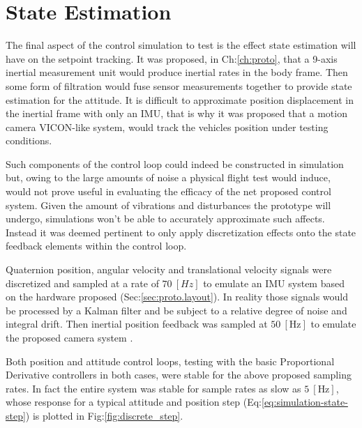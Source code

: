 \section{State Estimation}
\label{sec:simulation.state}
The final aspect of the control simulation to test is the effect state estimation will have on the setpoint tracking. It was proposed, in Ch:\ref{ch:proto}, that a 9-axis inertial measurement unit would produce inertial rates in the body frame. Then some form of filtration would fuse sensor measurements together to provide state estimation for the attitude. It is difficult to approximate position displacement in the inertial frame with only an IMU, that is why it was proposed that a motion camera VICON-like system, \cite{arnold} would track the vehicles position under testing conditions. 
\par
Such components of the control loop could indeed be constructed in simulation but, owing to the large amounts of noise a physical flight test would induce, would not prove useful in evaluating the efficacy of the net proposed control system. Given the amount of vibrations and disturbances the prototype will undergo, simulations won't be able to accurately approximate such affects. Instead it was deemed pertinent to only apply discretization effects onto the state feedback elements within the control loop.
\par
Quaternion position, angular velocity and translational velocity signals were discretized and sampled at a rate of $70~[Hz]$ to emulate an IMU system based on the hardware proposed (Sec:\ref{sec:proto.layout}). In reality those signals would be processed by a Kalman filter and be subject to a relative degree of noise and integral drift. Then inertial position feedback was sampled at $50~[\text{Hz}]$ to emulate the proposed camera system \cite{arnold}.
\par
Both position and attitude control loops, testing with the basic Proportional Derivative controllers in both cases, were stable for the above proposed sampling rates. In fact the entire system was stable for sample rates as slow as $5~[\text{Hz}]$, whose response for a typical attitude and position step (Eq:\ref{eq:simulation-state-step}) is plotted in Fig:\ref{fig:discrete_step}.
